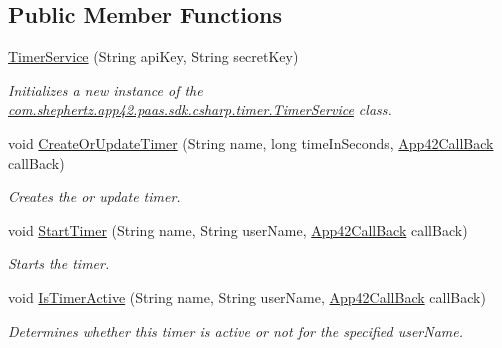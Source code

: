 \subsection*{Public Member Functions}
\begin{DoxyCompactItemize}
\item 
\hyperlink{classcom_1_1shephertz_1_1app42_1_1paas_1_1sdk_1_1csharp_1_1timer_1_1_timer_service_a6005b3ff75001cf47c66de6950a2f92c}{Timer\+Service} (String api\+Key, String secret\+Key)
\begin{DoxyCompactList}\small\item\em Initializes a new instance of the \hyperlink{classcom_1_1shephertz_1_1app42_1_1paas_1_1sdk_1_1csharp_1_1timer_1_1_timer_service}{com.\+shephertz.\+app42.\+paas.\+sdk.\+csharp.\+timer.\+Timer\+Service} class. \end{DoxyCompactList}\item 
void \hyperlink{classcom_1_1shephertz_1_1app42_1_1paas_1_1sdk_1_1csharp_1_1timer_1_1_timer_service_afbe886a79998291a83df6595b1f77c0f}{Create\+Or\+Update\+Timer} (String name, long time\+In\+Seconds, \hyperlink{interfacecom_1_1shephertz_1_1app42_1_1paas_1_1sdk_1_1csharp_1_1_app42_call_back}{App42\+Call\+Back} call\+Back)
\begin{DoxyCompactList}\small\item\em Creates the or update timer. \end{DoxyCompactList}\item 
void \hyperlink{classcom_1_1shephertz_1_1app42_1_1paas_1_1sdk_1_1csharp_1_1timer_1_1_timer_service_ab12e4304c1a0a7f39481c5ea1c75e5a0}{Start\+Timer} (String name, String user\+Name, \hyperlink{interfacecom_1_1shephertz_1_1app42_1_1paas_1_1sdk_1_1csharp_1_1_app42_call_back}{App42\+Call\+Back} call\+Back)
\begin{DoxyCompactList}\small\item\em Starts the timer. \end{DoxyCompactList}\item 
void \hyperlink{classcom_1_1shephertz_1_1app42_1_1paas_1_1sdk_1_1csharp_1_1timer_1_1_timer_service_ac9a325bd4b269ca79696be35b28c1576}{Is\+Timer\+Active} (String name, String user\+Name, \hyperlink{interfacecom_1_1shephertz_1_1app42_1_1paas_1_1sdk_1_1csharp_1_1_app42_call_back}{App42\+Call\+Back} call\+Back)
\begin{DoxyCompactList}\small\item\em Determines whether this timer is active or not for the specified user\+Name. \end{DoxyCompactList}\item 

\end{DoxyCompactItemize}

